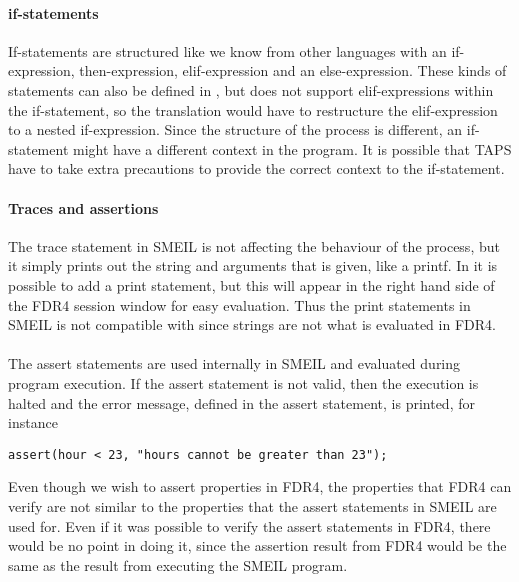 \paragraph{if-statements}
If-statements are structured like we know from other languages with an if-expression, then-expression, elif-expression and an else-expression.
These kinds of statements can also be defined in \cspm, but \cspm does not support elif-expressions within the if-statement, so the translation would have to restructure the elif-expression to a nested if-expression.
Since the structure of the \cspm process is different, an if-statement might have a different context in the \cspm program. It is possible that TAPS have to take extra precautions to provide the correct context to the if-statement.

\paragraph{Traces and assertions}
The trace statement in SMEIL is not affecting the behaviour of the process, but it simply prints out the string and arguments that is given, like a printf.
In \cspm it is possible to add a print statement, but this will appear in the right hand side of the FDR4 session window for easy evaluation. Thus the print statements in SMEIL is not compatible with \cspm since strings are not what is evaluated in FDR4.\\\\
The assert statements are used internally in SMEIL and evaluated during program execution. If the assert statement is not valid, then the execution is halted and the error message, defined in the assert statement, is printed, for instance
\begin{verbatim}
assert(hour < 23, "hours cannot be greater than 23");
\end{verbatim}
Even though we wish to assert properties in FDR4, the properties that FDR4 can verify are not similar to the properties that the assert statements in SMEIL are used for. Even if it was possible to verify the assert statements in FDR4, there would be no point in doing it, since the assertion result from FDR4 would be the same as the result from executing the SMEIL program.

